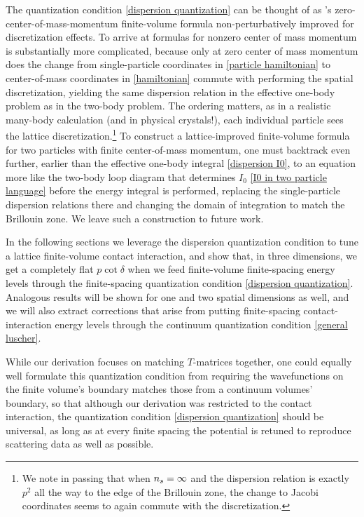 The quantization condition \eqref{dispersion quantization} can be thought of as \Luscher's zero-center-of-mass-momentum finite-volume formula non-perturbatively improved for discretization effects.
To arrive at formulas for nonzero center of mass momentum is substantially more complicated, because only at zero center of mass momentum does the change from single-particle coordinates in \eqref{particle hamiltonian} to center-of-mass coordinates in \eqref{hamiltonian} commute with performing the spatial discretization, yielding the same dispersion relation in the effective one-body problem as in the two-body problem.
The ordering matters, as in a realistic many-body calculation (and in physical crystals!), each individual particle sees the lattice discretization.\footnote{
We note in passing that when ${n_s}=\infty$ and the dispersion relation is exactly $p^2$ all the way to the edge of the Brillouin zone, the change to Jacobi coordinates seems to again commute with the discretization.}
To construct a lattice-improved finite-volume formula for two particles with finite center-of-mass momentum, one must backtrack even further, earlier than the effective one-body integral \eqref{dispersion I0}, to an equation more like the two-body loop diagram that determines $I_0$ \eqref{I0 in two particle language} before the energy integral is performed, replacing the single-particle dispersion relations there and changing the domain of integration to match the Brillouin zone.
We leave such a construction to future work.

In the following sections we leverage the dispersion quantization condition to tune a lattice finite-volume contact interaction, and show that, in three dimensions, we get a completely flat $p \cot \delta$ when we feed finite-volume finite-spacing energy levels through the finite-spacing quantization condition \eqref{dispersion quantization}.
Analogous results will be shown for one and two spatial dimensions as well, and we will also extract corrections that arise from putting finite-spacing contact-interaction energy levels through the continuum quantization condition \eqref{general luscher}.

While our derivation focuses on matching $T$-matrices together, one could equally well formulate this quantization condition from requiring the wavefunctions on the finite volume's boundary matches those from a continuum volumes' boundary, so that although our derivation was restricted to the contact interaction, the quantization condition \eqref{dispersion quantization} should be universal, as long as at every finite spacing the potential is retuned to reproduce scattering data as well as possible.
